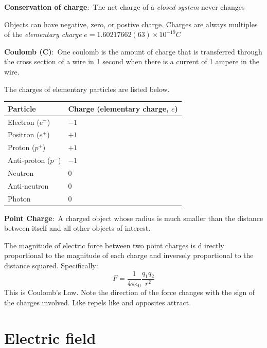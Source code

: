 \documentclass[nobib]{tufte-handout}
\newcommand{\defn}[2]{\noindent\textbf{#1}:\ #2}
\begin{document}
\defn{Conservation of charge}{The net charge of a \emph{closed system} never changes}

Objects can have negative, zero, or postive charge. 
Charges are always multiples of the \emph{elementary charge} $e = 1.60217662(63) \times 10^{-19} C$

\defn{Coulomb (C)}{One coulomb is the amount of charge that is
transferred through the cross section of a wire in 1 second
when there is a current of 1 ampere in the wire.}

The charges of elementary particles are listed below.
\begin{table}[ht]
    \centering
    \begin{tabular}{@{}ll@{}}
    \toprule
    Particle & Charge (elementary charge, $e$) \\
    \midrule
    Electron ($e^-$) & $-1$ \\
    Positron ($e^+$) & $+1$ \\
    Proton ($p^+$) & $+1$ \\
    Anti-proton ($p^-$) & $-1$ \\
    Neutron& $0$ \\
    Anti-neutron & $0$ \\
    Photon& $0$ \\
    \bottomrule
    \end{tabular}
    \end{table}

\defn{Point Charge}{A charged object whose
radius is much smaller than the distance
between itself and all other objects of
interest.}

The magnitude of electric force between two point charges is d
irectly proportional to the magnitude of each charge and 
inversely proportional to the distance squared. Specifically:
\[F = \frac{1}{4\pi \epsilon_0}\frac{q_1 q_2}{r^2}\]
This is Coulomb's Law. Note the direction of the force changes
with the sign of the charges involved. Like repels like and opposites
attract. 

\pagebreak 

\section{Electric field}
\end{document}
